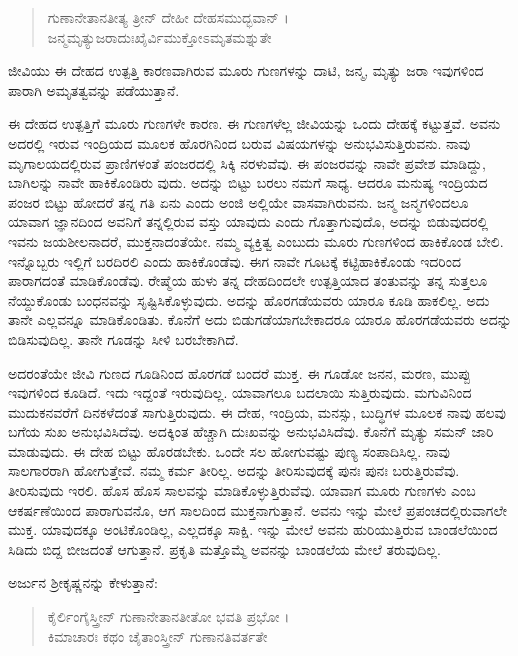 \begin{verse}
ಗುಣಾನೇತಾನತೀತ್ಯ ತ್ರೀನ್ ದೇಹೀ ದೇಹಸಮುದ್ಭವಾನ್ ।\\ಜನ್ಮಮೃತ್ಯುಜರಾದುಃಖೈರ್ವಿಮುಕ್ತೋಽಮೃತಮಶ್ನುತೇ 
\end{verse}

{\small ಜೀವಿಯು ಈ ದೇಹದ ಉತ್ಪತ್ತಿ ಕಾರಣವಾಗಿರುವ ಮೂರು ಗುಣಗಳನ್ನು ದಾಟಿ, ಜನ್ಮ, ಮೃತ್ಯು ಜರಾ ಇವುಗಳಿಂದ ಪಾರಾಗಿ ಅಮೃತತ್ವವನ್ನು ಪಡೆಯುತ್ತಾನೆ.}

ಈ ದೇಹದ ಉತ್ಪತ್ತಿಗೆ ಮೂರು ಗುಣಗಳೇ ಕಾರಣ. ಈ ಗುಣಗಳೆಲ್ಲ ಜೀವಿಯನ್ನು ಒಂದು ದೇಹಕ್ಕೆ ಕಟ್ಟುತ್ತವೆ. ಅವನು ಅದರಲ್ಲಿ ಇರುವ ಇಂದ್ರಿಯದ ಮೂಲಕ ಹೊರಗಿನಿಂದ ಬರುವ ವಿಷಯಗಳನ್ನು ಅನುಭವಿಸುತ್ತಿರುವನು. ನಾವು ಮೃಗಾಲಯದಲ್ಲಿರುವ ಪ್ರಾಣಿಗಳಂತೆ ಪಂಜರದಲ್ಲಿ ಸಿಕ್ಕಿ ನರಳುವೆವು. ಈ ಪಂಜರವನ್ನು ನಾವೇ ಪ್ರವೇಶ ಮಾಡಿದ್ದು, ಬಾಗಿಲನ್ನು ನಾವೇ ಹಾಕಿಕೊಂಡಿರು ವುದು. ಅದನ್ನು ಬಿಟ್ಟು ಬರಲು ನಮಗೆ ಸಾಧ್ಯ. ಆದರೂ ಮನುಷ್ಯ ಇಂದ್ರಿಯದ ಪಂಜರ ಬಿಟ್ಟು ಹೋದರೆ ತನ್ನ ಗತಿ ಏನು ಎಂದು ಅಂಜಿ ಅಲ್ಲಿಯೇ ವಾಸವಾಗಿರುವನು. ಜನ್ಮ ಜನ್ಮಗಳಿಂದಲೂ ಯಾವಾಗ ಜ್ಞಾನದಿಂದ ಅವನಿಗೆ ತನ್ನಲ್ಲಿರುವ ವಸ್ತು ಯಾವುದು ಎಂದು ಗೊತ್ತಾಗುವುದೊ, ಅದನ್ನು ಬಿಡುವುದರಲ್ಲಿ ಇವನು ಜಯಶೀಲನಾದರೆ, ಮುಕ್ತನಾದಂತೆಯೇ. ನಮ್ಮ ವ್ಯಕ್ತಿತ್ವ ಎಂಬುದು ಮೂರು ಗುಣಗಳಿಂದ ಹಾಕಿಕೊಂಡ ಬೇಲಿ. ಇನ್ನೊಬ್ಬರು ಇಲ್ಲಿಗೆ ಬರದಿರಲಿ ಎಂದು ಹಾಕಿಕೊಂಡೆವು. ಈಗ ನಾವೇ ಗೂಟಕ್ಕೆ ಕಟ್ಟಿಹಾಕಿಕೊಂಡು ಇದರಿಂದ ಪಾರಾಗದಂತೆ ಮಾಡಿಕೊಂಡೆವು. ರೇಷ್ಮೆಯ ಹುಳು ತನ್ನ ದೇಹದಿಂದಲೇ ಉತ್ಪತ್ತಿಯಾದ ತಂತುವನ್ನು ತನ್ನ ಸುತ್ತಲೂ ನೆಯ್ದುಕೊಂಡು ಬಂಧನವನ್ನು ಸೃಷ್ಟಿಸಿಕೊಳ್ಳುವುದು. ಅದನ್ನು ಹೊರಗಡೆಯವರು ಯಾರೂ ಕೂಡಿ ಹಾಕಲಿಲ್ಲ. ಅದು ತಾನೇ ಎಲ್ಲವನ್ನೂ ಮಾಡಿಕೊಂಡಿತು. ಕೊನೆಗೆ ಅದು ಬಿಡುಗಡೆಯಾಗಬೇಕಾದರೂ ಯಾರೂ ಹೊರಗಡೆಯವರು ಅದನ್ನು ಬಿಡಿಸುವುದಿಲ್ಲ. ತಾನೇ ಗೂಡನ್ನು ಸೀಳಿ ಬರಬೇಕಾಗಿದೆ.

ಅದರಂತೆಯೇ ಜೀವಿ ಗುಣದ ಗೂಡಿನಿಂದ ಹೊರಗಡೆ ಬಂದರೆ ಮುಕ್ತ. ಈ ಗೂಡೋ ಜನನ, ಮರಣ, ಮುಪ್ಪು ಇವುಗಳಿಂದ ಕೂಡಿದೆ. ಇದು ಇದ್ದಂತೆ ಇರುವುದಿಲ್ಲ. ಯಾವಾಗಲೂ ಬದಲಾಯಿ ಸುತ್ತಿರುವುದು. ಮಗುವಿನಿಂದ ಮುದುಕನವರೆಗೆ ದಿನಕಳೆದಂತೆ ಸಾಗುತ್ತಿರುವುದು. ಈ ದೇಹ, ಇಂದ್ರಿಯ, ಮನಸ್ಸು, ಬುದ್ಧಿಗಳ ಮೂಲಕ ನಾವು ಹಲವು ಬಗೆಯ ಸುಖ ಅನುಭವಿಸಿದೆವು. ಅದಕ್ಕಿಂತ ಹೆಚ್ಚಾಗಿ ದುಃಖವನ್ನು ಅನುಭವಿಸಿದೆವು. ಕೊನೆಗೆ ಮೃತ್ಯು ಸಮನ್ ಜಾರಿ ಮಾಡುವುದು. ಈ ದೇಹ ಬಿಟ್ಟು ಹೊರಡಬೇಕು. ಒಂದೇ ಸಲ ಹೋಗುವಷ್ಟು ಪುಣ್ಯ ಸಂಪಾದಿಸಿಲ್ಲ. ನಾವು ಸಾಲಗಾರರಾಗಿ ಹೋಗುತ್ತೇವೆ. ನಮ್ಮ ಕರ್ಮ ತೀರಿಲ್ಲ. ಅದನ್ನು ತೀರಿಸುವುದಕ್ಕೆ ಪುನಃ ಪುನಃ ಬರುತ್ತಿರುವೆವು. ತೀರಿಸುವುದು ಇರಲಿ. ಹೊಸ ಹೊಸ ಸಾಲವನ್ನು ಮಾಡಿಕೊಳ್ಳುತ್ತಿರುವೆವು. ಯಾವಾಗ ಮೂರು ಗುಣಗಳು ಎಂಬ ಆಕರ್ಷಣೆಯಿಂದ ಪಾರಾಗುವನೊ, ಆಗ ಸಾಲದಿಂದ ಮುಕ್ತನಾಗುತ್ತಾನೆ. ಅವನು ಇನ್ನು ಮೇಲೆ ಪ್ರಪಂಚದಲ್ಲಿರುವಾಗಲೇ ಮುಕ್ತ. ಯಾವುದಕ್ಕೂ ಅಂಟಿಕೊಂಡಿಲ್ಲ, ಎಲ್ಲದಕ್ಕೂ ಸಾಕ್ಷಿ. ಇನ್ನು ಮೇಲೆ ಅವನು ಹುರಿಯುತ್ತಿರುವ ಬಾಂಡಲೆಯಿಂದ ಸಿಡಿದು ಬಿದ್ದ ಬೀಜದಂತೆ ಆಗುತ್ತಾನೆ. ಪ್ರಕೃತಿ ಮತ್ತೊಮ್ಮೆ ಅವನನ್ನು ಬಾಂಡಲೆಯ ಮೇಲೆ ತರುವುದಿಲ್ಲ.

ಅರ್ಜುನ ಶ್ರೀಕೃಷ್ಣನನ್ನು ಕೇಳುತ್ತಾನೆ:

\begin{verse}
ಕೈರ್ಲಿಂಗೈಸ್ತ್ರೀನ್ ಗುಣಾನೇತಾನತೀತೋ ಭವತಿ ಪ್ರಭೋ ।\\ಕಿಮಾಚಾರಃ ಕಥಂ ಚೈತಾಂಸ್ತ್ರೀನ್ ಗುಣಾನತಿವರ್ತತೇ 
\end{verse}

